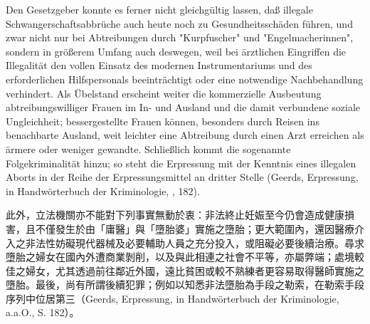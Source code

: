 \documentclass[12pt]{article}
\begin{document}
\syncleft
\begin{sourcepara}
Den Gesetzgeber konnte es ferner nicht gleichgültig lassen, daß illegale Schwangerschaftsabbrüche auch heute noch zu Gesundheitsschäden führen, und zwar nicht nur bei Abtreibungen durch "Kurpfuscher" und "Engelmacherinnen", sondern in größerem Umfang auch deswegen, weil bei ärztlichen Eingriffen die Illegalität den vollen Einsatz des modernen Instrumentariums und des erforderlichen Hilfspersonals beeinträchtigt oder eine notwendige Nachbehandlung verhindert. Als Übelstand erscheint weiter die kommerzielle Ausbeutung abtreibungswilliger Frauen im In- und Ausland und die damit verbundene soziale Ungleichheit; bessergestellte Frauen können, besonders durch Reisen ins benachbarte Ausland, weit leichter eine Abtreibung durch einen Arzt erreichen als ärmere oder weniger gewandte. Schließlich kommt die sogenannte Folgekriminalität hinzu; so steht die Erpressung mit der Kenntnis eines illegalen Aborts in der Reihe der Erpressungsmittel an dritter Stelle (Geerds, Erpressung, in Handwörterbuch der Kriminologie, \abbrAAO{}, \abbrS{} 182).
\end{sourcepara}
\begin{transpara}
此外，立法機關亦不能對下列事實無動於衷：非法終止妊娠至今仍會造成健康損害，且不僅發生於由「庸醫」與「墮胎婆」實施之墮胎；更大範圍內，還因醫療介入之非法性妨礙現代器械及必要輔助人員之充分投入，或阻礙必要後續治療。尋求墮胎之婦女在國內外遭商業剝削，以及與此相連之社會不平等，亦屬弊端；處境較佳之婦女，尤其透過前往鄰近外國，遠比貧困或較不熟練者更容易取得醫師實施之墮胎。最後，尚有所謂後續犯罪；例如以知悉非法墮胎為手段之勒索，在勒索手段序列中位居第三（Geerds, Erpressung, in Handwörterbuch der Kriminologie, a.a.O., S. 182）。
\end{transpara}
\end{document}
